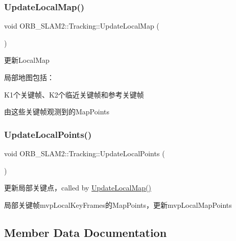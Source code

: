 \subsubsection{\texorpdfstring{Update\+Local\+Map()}{UpdateLocalMap()}}
{\footnotesize\ttfamily void O\+R\+B\+\_\+\+S\+L\+A\+M2\+::\+Tracking\+::\+Update\+Local\+Map (\begin{DoxyParamCaption}{ }\end{DoxyParamCaption})\hspace{0.3cm}{\ttfamily [protected]}}



更新\+Local\+Map 

局部地图包括： ~\newline

\begin{DoxyItemize}
\item K1个关键帧、\+K2个临近关键帧和参考关键帧
\item 由这些关键帧观测到的\+Map\+Points 
\end{DoxyItemize}\mbox{\label{class_o_r_b___s_l_a_m2_1_1_tracking_a25843575116bf18c065d6cc7645f5b26}} 
\subsubsection{\texorpdfstring{Update\+Local\+Points()}{UpdateLocalPoints()}}
{\footnotesize\ttfamily void O\+R\+B\+\_\+\+S\+L\+A\+M2\+::\+Tracking\+::\+Update\+Local\+Points (\begin{DoxyParamCaption}{ }\end{DoxyParamCaption})\hspace{0.3cm}{\ttfamily [protected]}}



更新局部关键点，called by \mbox{\hyperlink{class_o_r_b___s_l_a_m2_1_1_tracking_a22723e9972c18a888dd51a82eec27b0a}{Update\+Local\+Map()}} 

局部关键帧mvp\+Local\+Key\+Frames的\+Map\+Points，更新mvp\+Local\+Map\+Points 

\subsection{Member Data Documentation}
\mbox{\label{class_o_r_b___s_l_a_m2_1_1_tracking_a8de5f87734670485f6b6097b14dd1fcb}} 

